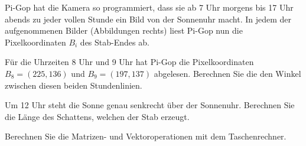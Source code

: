 Pi-Gop hat die Kamera so programmiert, dass sie ab 7 Uhr morgens bis 17 Uhr abends zu jeder vollen
Stunde ein Bild von der Sonnenuhr macht. In jedem der aufgenommenen Bilder (Abbildungen rechts) 
liest Pi-Gop nun die Pixelkoordinaten $B_i$ des Stab-Endes ab. 
\begin{teilaufgaben}
 \item
 Für die Uhrzeiten 8 Uhr und 9 Uhr hat Pi-Gop die Pixelkoordinaten $B_8 = (225, 136 )$ und 
 $B_9 = (197, 137)$ abgelesen.
 Berechnen Sie die den Winkel zwischen diesen beiden Stundenlinien.
 \item
 Um 12 Uhr steht die Sonne genau senkrecht über der Sonnenuhr. Berechnen Sie die Länge des Schattens,
 welchen der Stab erzeugt.
\end{teilaufgaben}

\begin{hinweis}
Berechnen Sie die Matrizen- und Vektoroperationen mit dem Taschenrechner.
\end{hinweis}


